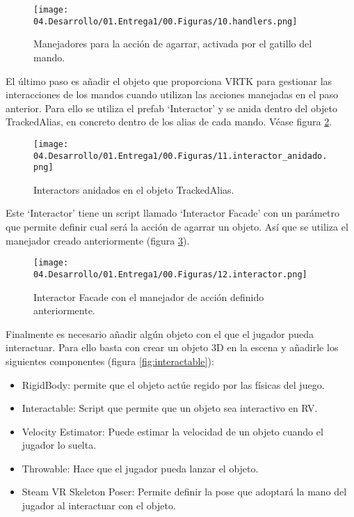 \begin{figure}
  \centering
    \texttt{[image: 04.Desarrollo/01.Entrega1/00.Figuras/10.handlers.png]}
    \caption{Manejadores para la acción de agarrar, activada por el gatillo del mando.}
    \label{fig:handlers}
\end{figure}

El último paso es añadir el objeto que proporciona VRTK para gestionar las interacciones de los mandos cuando utilizan las acciones manejadas en el paso anterior. Para ello se utiliza el prefab ‘Interactor’ y se anida dentro del objeto TrackedAlias, en concreto dentro de los alias de cada mando. Véase figura \ref{fig:interactorAnidado}.

\begin{figure}
  \centering
    \texttt{[image: 04.Desarrollo/01.Entrega1/00.Figuras/11.interactor\_anidado.png]}
    \caption{Interactors anidados en el objeto TrackedAlias.}
    \label{fig:interactorAnidado}
\end{figure}

Este ‘Interactor’ tiene un script llamado ‘Interactor Facade’ con un parámetro que permite definir cual será la acción de agarrar un objeto. Así que se utiliza el manejador creado anteriormente (figura \ref{fig:interactor}). 

\begin{figure}
  \centering
    \texttt{[image: 04.Desarrollo/01.Entrega1/00.Figuras/12.interactor.png]}
    \caption{Interactor Facade con el manejador de acción definido anteriormente.}
    \label{fig:interactor}
\end{figure}

Finalmente es necesario añadir algún objeto con el que el jugador pueda interactuar. Para ello basta con crear un objeto 3D en la escena y añadirle los siguientes componentes (figura \ref{fig:interactable}):



\begin{itemize}
	\item{RigidBody: permite que el objeto actúe regido por las físicas del juego.}

	\item{Interactable: Script que permite que un objeto sea interactivo en RV.}
	
	\item{Velocity Estimator: Puede estimar la velocidad de un objeto cuando el jugador lo suelta.}
	
	\item{Throwable: Hace que el jugador pueda lanzar el objeto.}
	
	\item{Steam VR Skeleton Poser: Permite definir la pose que adoptará la mano del jugador al interactuar con el objeto.}

\end{itemize}

